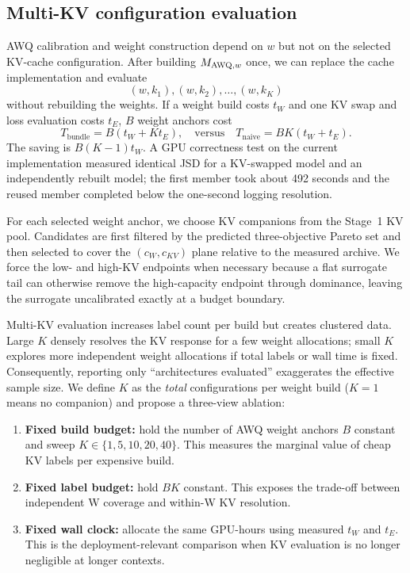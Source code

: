 \subsection{Multi-KV configuration evaluation}
\label{sec:multi_kv}

AWQ calibration and weight construction depend on $w$ but not on the selected
KV-cache configuration.  After building $M_{\mathrm{AWQ},w}$ once, we can replace the
cache implementation and evaluate
\begin{equation}
 (w,k_1),(w,k_2),\ldots,(w,k_K)
 \label{eq:kv_bundle}
\end{equation}
without rebuilding the weights.  If a weight build costs $t_W$ and one KV swap
and loss evaluation costs $t_E$, $B$ weight anchors cost
\begin{equation}
 T_{\mathrm{bundle}}=B(t_W+Kt_E),
 \quad\text{versus}\quad
 T_{\mathrm{naive}}=BK(t_W+t_E).
 \label{eq:amortization}
\end{equation}
The saving is $B(K-1)t_W$.  A GPU correctness test on the current implementation
measured identical JSD for a KV-swapped model and an independently rebuilt model;
the first member took about 492 seconds and the reused member completed below the
one-second logging resolution.

For each selected weight anchor, we choose KV companions from the Stage~1 KV
pool.  Candidates are first filtered by the predicted three-objective Pareto set
and then selected to cover the $(c_W,c_{KV})$ plane relative to the measured
archive.  We force the low- and high-KV endpoints when necessary because a flat
surrogate tail can otherwise remove the high-capacity endpoint through
dominance, leaving the surrogate uncalibrated exactly at a budget boundary.

Multi-KV evaluation increases label count per build but creates clustered data.
Large $K$ densely resolves the KV response for a few weight allocations; small
$K$ explores more independent weight allocations if total labels or wall time
is fixed.  Consequently, reporting only ``architectures evaluated'' exaggerates
the effective sample size.  We define $K$ as the \emph{total} configurations per
weight build ($K=1$ means no companion) and propose a three-view ablation:

\begin{enumerate}[leftmargin=*,itemsep=2pt]
    \item \textbf{Fixed build budget:} hold the number of AWQ weight anchors
    $B$ constant and sweep $K\in\{1,5,10,20,40\}$.  This measures the marginal
    value of cheap KV labels per expensive build.
    \item \textbf{Fixed label budget:} hold $BK$ constant.  This exposes the
    trade-off between independent W coverage and within-W KV resolution.
    \item \textbf{Fixed wall clock:} allocate the same GPU-hours using measured
    $t_W$ and $t_E$.  This is the deployment-relevant comparison when KV
    evaluation is no longer negligible at longer contexts.
\end{enumerate}

